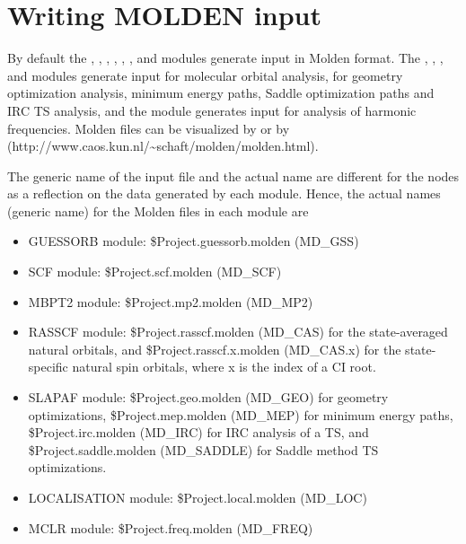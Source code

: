 \section{Writing MOLDEN input}
\label{TUT:sec:Molden}
 

By default the , , , ,
, , and  modules
generate input in Molden format. The , , ,
and  modules generate input for molecular orbital
analysis,  for geometry optimization analysis, minimum energy paths,
Saddle optimization paths and IRC TS analysis,
and the  module generates input for
analysis of harmonic frequencies. Molden files can be visualized by 
or by  (http://www.caos.kun.nl/\~{}schaft/molden/molden.html).

The generic name of the input file and the actual
name are different for the nodes as a reflection on the data generated
by each module. Hence, the actual names (generic name) for the Molden files in each module are
\begin{itemize}
\item GUESSORB module:
\$Project.guessorb.molden (MD\_GSS)
\item SCF module:
\$Project.scf.molden (MD\_SCF)
\item MBPT2 module:
\$Project.mp2.molden (MD\_MP2)
\item RASSCF module:
\$Project.rasscf.molden (MD\_CAS) for the state-averaged natural orbitals, and
\$Project.rasscf.x.molden (MD\_CAS.x) for the state-specific natural spin orbitals,
where x is the index of a CI root.
\item SLAPAF module:
\$Project.geo.molden (MD\_GEO) for geometry optimizations,
\$Project.mep.molden (MD\_MEP) for minimum energy paths,
\$Project.irc.molden (MD\_IRC) for IRC analysis of a TS, and
\$Project.saddle.molden (MD\_SADDLE) for Saddle method TS optimizations.
\item LOCALISATION module:
\$Project.local.molden (MD\_LOC)
\item MCLR module:
\$Project.freq.molden (MD\_FREQ)
\end{itemize}
